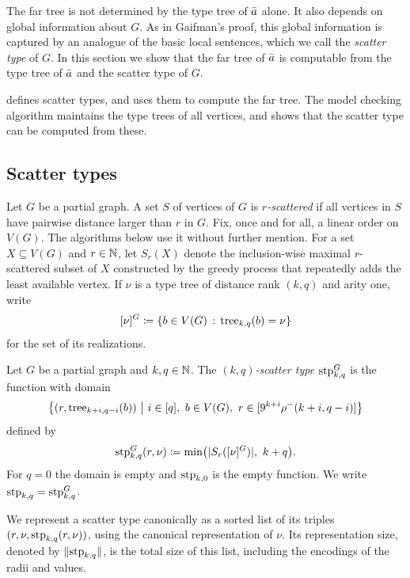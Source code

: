 The far tree is not determined by the type tree of $\bar a$ alone. It also depends on global information about $G$.
As in Gaifman's proof, this global information is captured by an analogue of the basic local sentences, which we call the \emph{scatter type} of $G$.
In this section we show that the far tree of $\bar a$ is computable from the type tree of $\bar a$ and the scatter type of $G$.

 defines scatter types, and  uses them to compute the far tree.
The model checking algorithm maintains the type trees of all vertices, and  shows that the scatter type can be computed from these.

\subsection{Scatter types}\label{sec:stp}

Let $G$ be a partial graph.
A set $S$ of vertices of $G$ is \emph{$r$-scattered} if all vertices in $S$ have pairwise distance larger than $r$ in $G$.
Fix, once and for all, a linear order on $V(G)$. The algorithms below use it without further mention.
For a set $X\subseteq V(G)$ and $r\in\mathbb N$, let $S_r(X)$ denote the inclusion-wise maximal $r$-scattered subset of $X$ constructed by the greedy process that repeatedly adds the least available vertex.
If $\nu$ is a type tree of distance rank $(k,q)$ and arity one, write
\[
[\nu]^G
\coloneqq
\{b\in V(G) \,:\, \mathrm{tree}_{k,q}(b)=\nu \}
\]
for the set of its realizations.

\begin{definition}\label{def:stp}
Let $G$ be a partial graph and $k,q\in\mathbb N$. The \emph{$(k,q)$-scatter type} $\textnormal{stp}_{k,q}^G$ is the function  with domain
\begin{align*}
\bigl\{(r,\mathrm{tree}_{k+i,q-i}(b))\ \big|\
i\in[q],\ b\in V(G),\ r\in[9^{k+i}\rho^-(k+i,q-i)]\bigr\}
\end{align*}
defined by
\[
\textnormal{stp}^G_{k,q}(r,\nu)
\coloneqq
\min\bigl(|S_r([\nu]^G)|,\ k+q\bigr).
\]
For $q=0$ the domain is empty and $\textnormal{stp}_{k,0}$ is the empty function. We write $\textnormal{stp}_{k,q}=\textnormal{stp}^{G}_{k,q}$.
\end{definition}

We represent a scatter type canonically as a sorted list of its triples
$(r,\nu,\textnormal{stp}_{k,q}(r,\nu))$, using the canonical representation of $\nu$.
Its representation size, denoted by $\lVert \textnormal{stp}_{k,q}\rVert$, is the total size of
this list, including the encodings of the radii and values.

